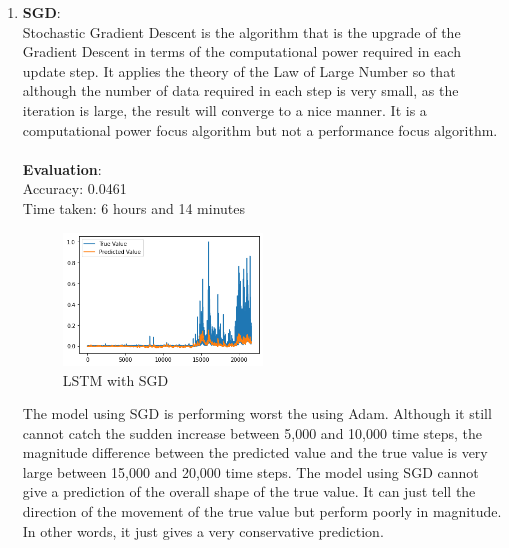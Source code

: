 \documentclass[11pt,a4paper]{article}
\begin{document}
\begin{enumerate}
        \item
        {
            \textbf{SGD}: \\
            Stochastic Gradient Descent is the algorithm that is the upgrade of the Gradient Descent in terms of the computational power required in each update step. It applies the theory of the Law of Large Number so that although the number of data required in each step is very small, as the iteration is large, the result will converge to a nice manner. It is a computational power focus algorithm but not a performance focus algorithm. \\
            \\
            \textbf{Evaluation}: \\
            Accuracy: 0.0461 \\
            Time taken: 6 hours and 14 minutes
            \begin{figure}[H]
                \centering
                \includegraphics[width = 0.5\textwidth]{crypto/plot/LSTM_SGD.png}
                \caption{LSTM with SGD}
                \label{fig:LSTM_SGD}
            \end{figure}
            The model using SGD is performing worst the using Adam. Although it still cannot catch the sudden increase between 5,000 and 10,000 time steps, the magnitude difference between the predicted value and the true value is very large between 15,000 and 20,000 time steps. The model using SGD cannot give a prediction of the overall shape of the true value. It can just tell the direction of the movement of the true value but perform poorly in magnitude. In other words, it just gives a very conservative prediction.
        }
        

\end{enumerate}
\end{document}
